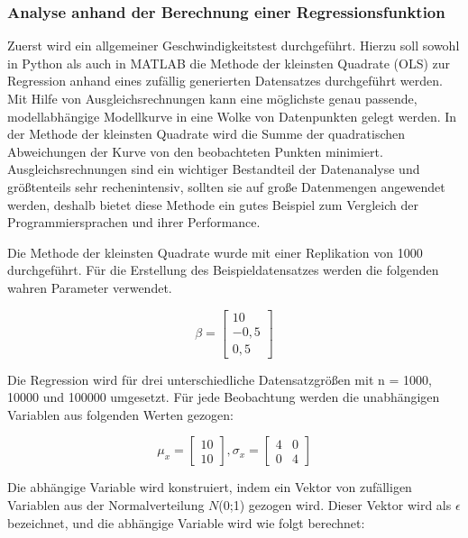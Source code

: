 \subsubsection{Analyse anhand der Berechnung einer Regressionsfunktion}

Zuerst wird ein allgemeiner Geschwindigkeitstest durchgeführt. Hierzu soll sowohl in Python als auch in MATLAB die Methode der kleinsten Quadrate (\ac{OLS}) zur Regression anhand eines zufällig generierten Datensatzes durchgeführt werden. Mit Hilfe von Ausgleichsrechnungen kann eine möglichste genau passende, modellabhängige Modellkurve in eine Wolke von Datenpunkten gelegt werden. In der Methode der kleinsten Quadrate wird die Summe der quadratischen Abweichungen der Kurve von den beobachteten Punkten minimiert. Ausgleichsrechnungen sind ein wichtiger Bestandteil der Datenanalyse und größtenteils sehr rechenintensiv, sollten sie auf große Datenmengen angewendet werden, deshalb bietet diese Methode ein gutes Beispiel zum Vergleich der Programmiersprachen und ihrer Performance.\cite{kleinsteQuadrate}

Die Methode der kleinsten Quadrate wurde mit einer Replikation von 1000 durchgeführt. Für die Erstellung des Beispieldatensatzes werden die folgenden wahren Parameter verwendet.

\begin{equation}
	\beta = \begin{bmatrix}
	 	10\\ 
	 	-0,5\\ 
	 	0,5
	\end{bmatrix}
\end{equation} 

Die Regression wird für drei unterschiedliche Datensatzgrößen mit n = 1000, 10000 und 100000 umgesetzt. Für jede Beobachtung werden die unabhängigen Variablen aus folgenden Werten gezogen:

\begin{equation}
	\mu _{x} = \begin{bmatrix}
		10\\ 
		10
	\end{bmatrix}
	, \sigma _{x} = \begin{bmatrix}
		4 & 0\\ 
		0 & 4
	\end{bmatrix}
\end{equation} 

Die abhängige Variable wird konstruiert, indem ein Vektor von zufälligen Variablen aus der Normalverteilung $N$(0;1) gezogen wird. Dieser Vektor wird als $ \epsilon $ bezeichnet, und die abhängige Variable wird wie folgt berechnet:

